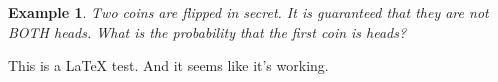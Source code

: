 \documentclass{article}
\newtheorem{example}{Example}[section]
\begin{document}
\begin{example}
Two coins are flipped in secret. It is guaranteed that they are not BOTH heads. What is the probability that the first coin is heads?
\end{example}

This is a \LaTeX{} test.
And it seems like it's working.

{}


\clearpage
 
\glsaddall
\printglossaries
\end{document}
